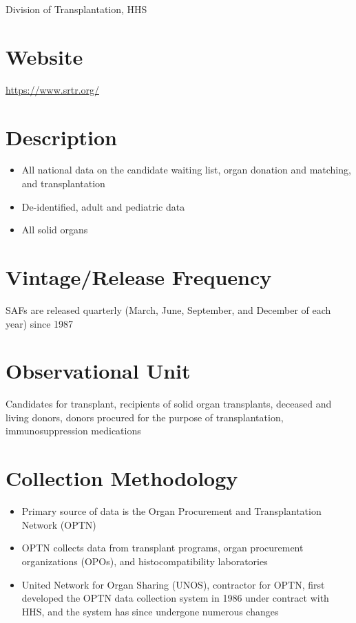 \documentclass[
]{book}
\providecommand{\tightlist}{%
  \setlength{\itemsep}{0pt}\setlength{\parskip}{0pt}}
\begin{document}
Division of Transplantation, HHS

\hypertarget{website-76}{%
\section{Website}\label{website-76}}

\url{https://www.srtr.org/}

\hypertarget{description-76}{%
\section{Description}\label{description-76}}

\begin{itemize}
\tightlist
\item
  All national data on the candidate waiting list, organ donation and matching, and transplantation
\item
  De-identified, adult and pediatric data
\item
  All solid organs
\end{itemize}

\hypertarget{vintagerelease-frequency-76}{%
\section{Vintage/Release Frequency}\label{vintagerelease-frequency-76}}

SAFs are released quarterly (March, June, September, and December of each year) since 1987

\hypertarget{observational-unit-76}{%
\section{Observational Unit}\label{observational-unit-76}}

Candidates for transplant, recipients of solid organ transplants, deceased and living donors, donors procured for the purpose of transplantation, immunosuppression medications

\hypertarget{collection-methodology-76}{%
\section{Collection Methodology}\label{collection-methodology-76}}

\begin{itemize}
\tightlist
\item
  Primary source of data is the Organ Procurement and Transplantation Network (OPTN)
\item
  OPTN collects data from transplant programs, organ procurement organizations (OPOs), and histocompatibility laboratories
\item
  United Network for Organ Sharing (UNOS), contractor for OPTN, first developed the OPTN data collection system in 1986 under contract with HHS, and the system has since undergone numerous changes
\end{itemize}
\end{document}
